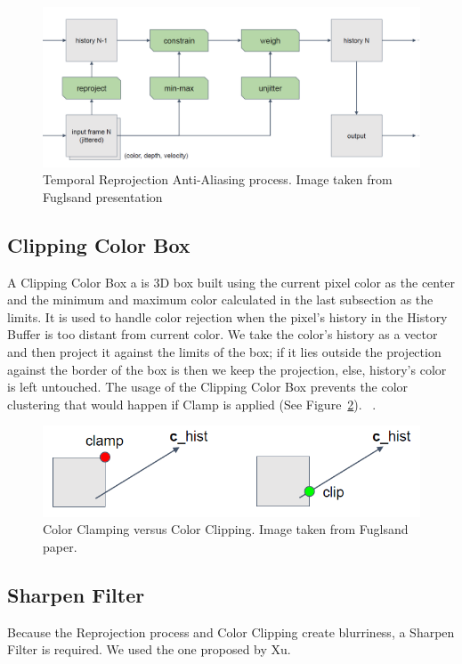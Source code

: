\documentclass{cslthse-msc}
\begin{document}
\begin{figure}[H]
	\centering
	\includegraphics[scale=0.4]{images/sampling_process.png}
	\caption{Temporal Reprojection Anti-Aliasing process. Image taken from Fuglsand presentation \protect\cite{Fuglsand2016}}\label{fig:samplingprocess}
\end{figure}

\subsection{Clipping Color Box} 
A Clipping Color Box a is 3D box built using the current pixel color as the center and the minimum and maximum color calculated in the last subsection as the limits. It is used to handle color rejection when the pixel's history in the History Buffer is too distant from current color. We take the color’s history as a vector and then project it against the limits of the box; if it lies outside the projection against the border of the box is then we keep the projection, else, history’s color is left untouched. The usage of the Clipping Color Box prevents the color clustering that would happen if Clamp is applied (See Figure~\ref{fig:clippingbox}). ~\cite{Fuglsand2016}.

\begin{figure}[!hbt]
	\centering
	\includegraphics[scale=0.4]{images/clipping_box.png}
	\caption{Color Clamping versus Color Clipping. Image taken from Fuglsand paper. \protect\cite{Fuglsand2016}}\label{fig:clippingbox}
\end{figure}


\subsection{Sharpen Filter} 
Because the Reprojection process and Color Clipping create blurriness, a Sharpen Filter is required. We used the one proposed by Xu. ~\cite{XU2016}
\end{document}
